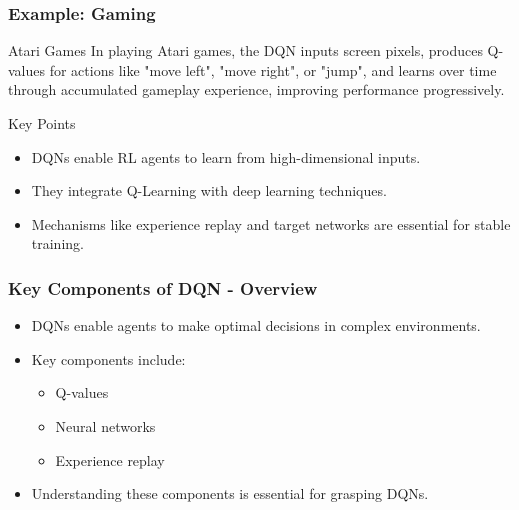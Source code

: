 \documentclass{beamer}
\begin{document}
\begin{frame}[fragile]
    \frametitle{Example: Gaming}
    \begin{block}{Atari Games}
        In playing Atari games, the DQN inputs screen pixels, produces Q-values for actions like "move left", "move right", or "jump", and learns over time through accumulated gameplay experience, improving performance progressively.
    \end{block}
    \begin{block}{Key Points}
        \begin{itemize}
            \item DQNs enable RL agents to learn from high-dimensional inputs.
            \item They integrate Q-Learning with deep learning techniques.
            \item Mechanisms like experience replay and target networks are essential for stable training.
        \end{itemize}
    \end{block}
\end{frame}

\begin{frame}[fragile]
    \frametitle{Key Components of DQN - Overview}
    \begin{itemize}
        \item DQNs enable agents to make optimal decisions in complex environments.
        \item Key components include:
        \begin{itemize}
            \item Q-values
            \item Neural networks
            \item Experience replay
        \end{itemize}
        \item Understanding these components is essential for grasping DQNs.
    \end{itemize}
\end{frame}
\end{document}
